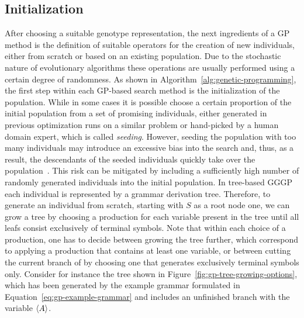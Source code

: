 \subsection{Initialization}
After choosing a suitable genotype representation, the next ingredients of a GP method is the definition of suitable operators for the creation of new individuals, either from scratch or based on an existing population.
Due to the stochastic nature of evolutionary algorithms these operations are usually performed using a certain degree of randomness.
As shown in Algorithm~\ref{alg:genetic-programming}, the first step within each GP-based search method is the initialization of the population. 
While in some cases it is possible choose a certain proportion of the initial population from a set of promising individuals, either generated in previous optimization runs on a similar problem or hand-picked by a human domain expert, which is called \emph{seeding}.
However, seeding the population with too many individuals may introduce an excessive bias into the search and, thus, as a result, the descendants of the seeded individuals quickly take over the population~\cite{poli2008field}.
This risk can be mitigated by including a sufficiently high number of randomly generated individuals into the initial population. 
In tree-based GGGP each individual is represented by a grammar derivation tree.
Therefore, to generate an individual from scratch, starting with $S$ as a root node one, we can grow a tree by choosing a production for each variable present in the tree until all leafs consist exclusively of terminal symbols.
Note that within each choice of a production, one has to decide between growing the tree further, which correspond to applying a production that contains at least one variable, or between cutting the current branch of by choosing one that generates exclusively terminal symbols only.
Consider for instance the tree shown in Figure~\ref{fig:gp-tree-growing-options}, which has been generated by the example grammar formulated in Equation~\eqref{eq:gp-example-grammar} and includes an unfinished branch with the variable $\langle A \rangle$.
